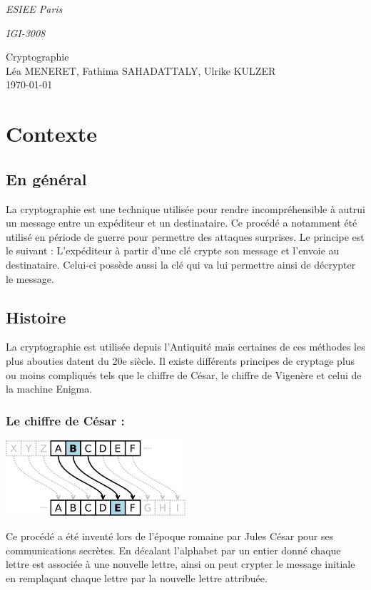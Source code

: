 \documentclass[a4paper,12pt,abstracton,titlepage]{scrartcl}
\begin{document}

{\Large\noindent \emph{ESIEE Paris}}

{\Large\noindent \emph{IGI-3008}}
\begin{center}
	{\large Cryptographie	 \\ \large Léa MENERET, Fathima SAHADATTALY, Ulrike KULZER \\ \today}
\end{center}

\setcounter{page}{1} %

\section{Contexte}
\subsection{En général}
La cryptographie est une technique utilisée pour rendre incompréhensible à autrui un message entre un expéditeur et un destinataire. Ce procédé a notamment été utilisé en période de guerre pour permettre des attaques surprises. 
Le principe est le suivant : L'expéditeur à partir d'une clé crypte son message et l'envoie au destinataire. Celui-ci possède aussi la clé qui va lui permettre ainsi de décrypter le message.

\subsection{Histoire}
La cryptographie est utilisée depuis l'Antiquité mais certaines de ces méthodes les plus abouties datent du 20e siècle. Il existe différents principes de cryptage plus ou moins compliqués tels que le chiffre de César, le chiffre de Vigenère et celui de la machine Enigma.

\subsubsection{Le chiffre de César :}
\begin{floatingfigure}[r]{8.3cm}
	\includegraphics[width=0.5\textwidth]{./Pictures/chiffreCesar.png}
	\label{cesar}
\end{floatingfigure}
Ce procédé a été inventé lors de l'époque romaine par Jules César pour ses communications secrètes. En décalant l'alphabet par un entier donné chaque lettre est associée à une nouvelle lettre, ainsi on peut crypter le message initiale en remplaçant chaque lettre par la nouvelle lettre attribuée.
\end{document}
